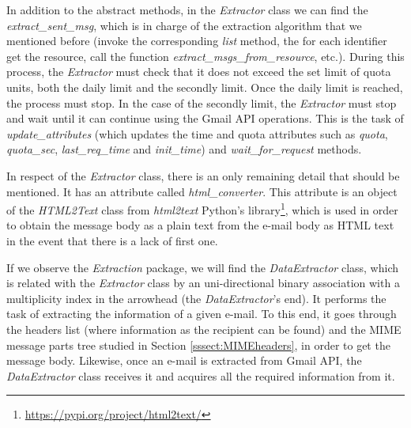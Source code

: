 In addition to the abstract methods, in the \textit{Extractor} class we can find the \textit{extract\_sent\_msg}, which is in charge of the extraction algorithm that we mentioned before (invoke the corresponding \textit{list} method, the for each identifier get the resource, call the function \textit{extract\_msgs\_from\_resource}, etc.). During this process, the \textit{Extractor} must check that it does not exceed the set limit of quota units, both the daily limit and the secondly limit. Once the daily limit is reached, the process must stop. In the case of the secondly limit, the \textit{Extractor} must stop and wait until it can continue using the Gmail API operations. This is the task of \textit{update\_attributes} (which updates the time and quota attributes such as \textit{quota}, \textit{quota\_sec}, \textit{last\_req\_time} and \textit{init\_time}) and \textit{wait\_for\_request} methods.

In respect of the \textit{Extractor} class, there is an only remaining detail that should be mentioned. It has an attribute called \textit{html\_converter}. This attribute is an object of the \textit{HTML2Text} class from \textit{html2text} Python's library\footnote{\url{https://pypi.org/project/html2text/}}, which is used in order to obtain the message body as a plain text from the e-mail body as HTML text in the event that there is a lack of first one.

If we observe the \textit{Extraction} package, we will find the \textit{DataExtractor} class, which is related with the \textit{Extractor} class by an uni-directional binary association with a multiplicity index in the arrowhead (the \textit{DataExtractor}'s end). It performs the task of extracting the information of a given e-mail. To this end, it goes through the headers list (where information as the recipient can be found) and the MIME message parts tree studied in Section \ref{sssect:MIMEheaders}, in order to get the message body. Likewise, once an e-mail is extracted from Gmail API, the \textit{DataExtractor} class receives it and acquires all the required information from it.